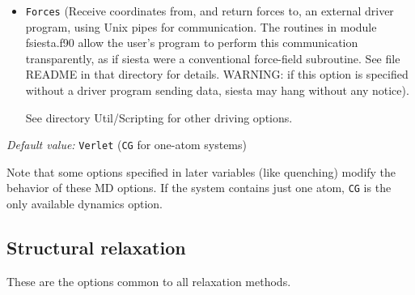 \documentclass[11pt]{article}
\begin{document}
\begin{itemize}
\item {\tt Forces} (Receive coordinates from, and return forces to, an
  external driver program, using Unix pipes for communication.  The
  routines in module fsiesta.f90 allow the user's program to perform
  this communication transparently, as if siesta were a conventional
  force-field subroutine. See file README in that directory for
  details. WARNING: if this option is specified without a driver
  program sending data, siesta may hang without any notice).

See directory Util/Scripting  for other driving options.

\end{itemize}
    
{\it Default value:} {\tt Verlet} ({\tt CG} for one-atom systems)

Note that some options specified in later variables
(like quenching) modify the behavior of these MD options.
If the system contains just one atom, {\tt CG} is the only 
available dynamics option.


\subsection{Structural relaxation}

These are the options common to all relaxation methods.
\end{document}
